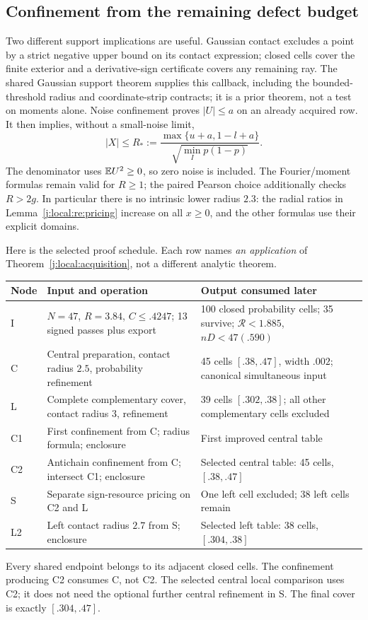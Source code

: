 \subsection{Confinement from the remaining defect budget}
Two different support implications are useful. Gaussian contact excludes
a point by a strict negative upper bound on its contact expression;
closed cells cover the finite exterior and a derivative-sign certificate
covers any remaining ray. The shared Gaussian support theorem supplies
this callback, including the bounded-threshold radius and coordinate-strip
contracts; it is a prior theorem, not a test on moments alone. Noise confinement proves $|U|\le a$ on an
already acquired row. It then implies, without a small-noise limit,
\begin{equation}\label{j:local:re:radiusfeedback}
 |X|\le R_*:=
 \frac{\max\{u+a,1-l+a\}}{\sqrt{\min_Ip(1-p)}}.
\end{equation}
The denominator uses $\mathbb E U^2\ge0$, so zero noise is included.
The Fourier/moment formulas remain valid for $R\ge1$; the paired Pearson
choice additionally checks $R>2g$. In particular there is no intrinsic
lower radius $2.3$: the radial ratios in Lemma~\ref{j:local:re:pricing} increase
on all $x\ge0$, and the other formulas use their explicit domains.

Here is the selected proof schedule. Each row names \emph{an application}
of Theorem~\ref{j:local:acquisition}, not a different analytic theorem.
\begin{center}\small
\begin{tabular}{p{.13\linewidth}p{.32\linewidth}p{.45\linewidth}}
\toprule
Node&Input and operation&Output consumed later\\\midrule
I&$N=47$, $R=3.84$, $C\le.4247$; 13 signed passes plus export&
100 closed probability cells; 35 survive; $\mathcal R<1.885$, $nD<47(.590)$\\
C&Central preparation, contact radius $2.5$, probability refinement&
45 cells $[.38,.47]$, width $.002$; canonical simultaneous input\\
L&Complete complementary cover, contact radius $3$, refinement&
39 cells $[.302,.38]$; all other complementary cells excluded\\
C1&First confinement from C; radius formula; enclosure&
First improved central table\\
C2&Antichain confinement from C; intersect C1; enclosure&
Selected central table: 45 cells, $[.38,.47]$\\
S&Separate sign-resource pricing on C2 and L&
One left cell excluded; 38 left cells remain\\
L2&Left contact radius $2.7$ from S; enclosure&
Selected left table: 38 cells, $[.304,.38]$\\\bottomrule
\end{tabular}
\end{center}
Every shared endpoint belongs to its adjacent closed cells. The
confinement producing C2 consumes C, not C2. The selected central local
comparison uses C2; it does not need the optional further central
refinement in S. The final cover is exactly $[.304,.47]$.


